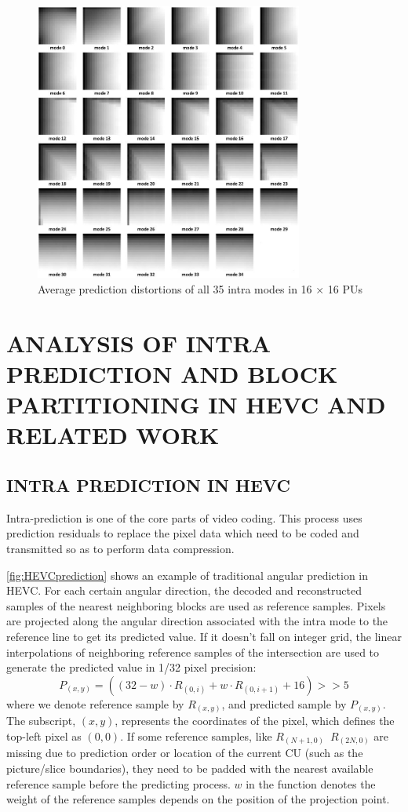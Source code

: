 \documentclass[journal]{IEEEtran}
\begin{document}
\begin{figure}[htpb]
\centering
\includegraphics[width=8.8cm]{pictures/residual}
\caption{Average prediction distortions of all 35 intra modes in 16 × 16 PUs}

\label{fig:residual}
\end{figure}
\section{ANALYSIS OF INTRA PREDICTION AND BLOCK PARTITIONING IN HEVC AND RELATED WORK}

\subsection{INTRA PREDICTION IN HEVC}
Intra-prediction is one of the core parts of video coding. This process uses prediction residuals to replace the pixel data which need to be coded and transmitted so as to perform data compression.

\autoref{fig:HEVCprediction} shows an example of traditional angular prediction in HEVC. For each certain angular direction, the decoded and reconstructed samples of the nearest neighboring blocks are used as reference samples. Pixels are projected along the angular direction associated with the intra mode to the reference line to get its predicted value. If it doesn't fall on integer grid, the linear interpolations of neighboring reference  samples  of the intersection are used to generate the predicted value in 1/32 pixel precision:
\begin{equation}
P_{(x,y)} =((32-w)\cdot R_{(0,i)} +w\cdot R_{(0,i+1)} +16)>>5
\end{equation}
where we denote reference sample by $R_{(x,y)}$, and predicted sample by $P_{(x,y)}$. The subscript, $(x,y)$, represents the coordinates of the pixel, which defines the top-left pixel as $(0,0)$. If some reference samples, like $R_{(N+1,0)}$~$R_{(2N,0)}$ are missing due to prediction order or location of the current CU (such as the picture/slice boundaries), they need to be padded with the nearest available reference sample before the predicting process. $w$ in the function denotes the weight of the reference samples depends on the position of the projection point.
\end{document}
